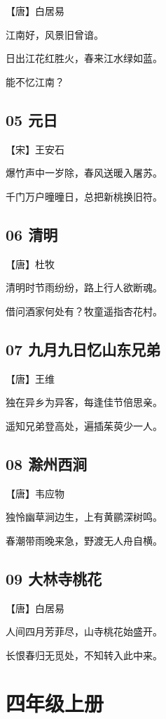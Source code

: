 \documentclass[12pt]{article}
\begin{document}
【唐】白居易

江南好，风景旧曾谙。

日出江花红胜火，春来江水绿如蓝。

能不忆江南？

\subsection*{05 元日}

【宋】王安石

爆竹声中一岁除，春风送暖入屠苏。

千门万户曈曈日，总把新桃换旧符。

\subsection*{06 清明}

【唐】杜牧

清明时节雨纷纷，路上行人欲断魂。

借问酒家何处有？牧童遥指杏花村。

\subsection*{07 九月九日忆山东兄弟}

【唐】王维

独在异乡为异客，每逢佳节倍思亲。

遥知兄弟登高处，遍插茱萸少一人。

\subsection*{08 滁州西涧}

【唐】韦应物

独怜幽草涧边生，上有黄鹂深树鸣。

春潮带雨晚来急，野渡无人舟自横。

\subsection*{09 大林寺桃花}

【唐】白居易

人间四月芳菲尽，山寺桃花始盛开。

长恨春归无觅处，不知转入此中来。

\newpage

\section*{四年级上册}
\end{document}
